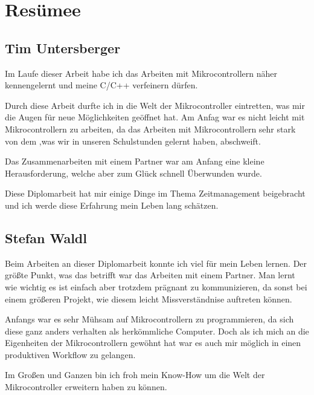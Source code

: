 \chapter{Resümee}

\section{Tim Untersberger}

Im Laufe dieser Arbeit habe ich das Arbeiten mit Mikrocontrollern näher kennengelernt und meine C/C++ verfeinern dürfen.

Durch diese Arbeit durfte ich in die Welt der Mikrocontroller eintretten, was mir die Augen für neue Möglichkeiten geöffnet hat. Am Anfag war es nicht leicht mit Mikrocontrollern zu arbeiten, da das Arbeiten mit Mikrocontrollern sehr stark von dem ,was wir in unseren Schulstunden gelernt haben, abschweift.

Das Zusammenarbeiten mit einem Partner war am Anfang eine kleine Herausforderung, welche aber zum Glück schnell Überwunden wurde.

Diese Diplomarbeit hat mir einige Dinge im Thema Zeitmanagement beigebracht und ich werde diese Erfahrung mein Leben lang schätzen.

\section{Stefan Waldl}
Beim Arbeiten an dieser Diplomarbeit konnte ich viel für mein Leben lernen. Der größte Punkt, was das betrifft war das Arbeiten mit einem Partner. Man lernt wie wichtig es ist einfach aber trotzdem prägnant zu kommunizieren, da sonst bei einem größeren Projekt, wie diesem leicht Missverständnise auftreten können.

Anfangs war es sehr Mühsam auf Mikrocontrollern zu programmieren, da sich diese ganz anders verhalten als herkömmliche Computer. Doch als ich mich an die Eigenheiten der Mikrocontrollern gewöhnt hat war es auch mir möglich in einen produktiven Workflow zu gelangen.

Im Großen und Ganzen bin ich froh mein Know-How um die Welt der Mikrocontroller erweitern haben zu können.